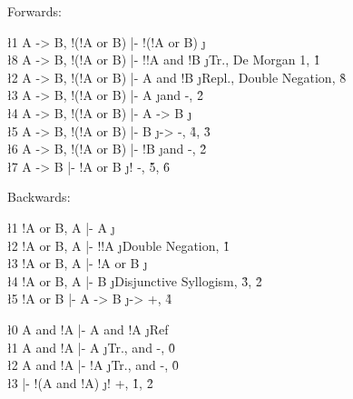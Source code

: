 \documentclass[class=cs245,leqno]{agony}
\begin{document}
\begin{theorem}[Implication]
\end{theorem}
\begin{prf}
  Forwards:
  \begin{deduce}
    \l1 A -> B, !(!A or B) |- !(!A or B) \j {\E}                          \\
    \l8 A -> B, !(!A or B) |- !!A and !B \j {Tr., De Morgan 1, \r1}       \\
    \l2 A -> B, !(!A or B) |- A and !B   \j {Repl., Double Negation, \r8} \\
    \l3 A -> B, !(!A or B) |- A          \j {and -, \r2}                  \\
    \l4 A -> B, !(!A or B) |- A -> B     \j {\E}                          \\
    \l5 A -> B, !(!A or B) |- B          \j {-> -, \r4, \r3}              \\
    \l6 A -> B, !(!A or B) |- !B         \j {and -, \r2}                  \\
    \l7 A -> B             |- !A or B    \j {! -, \r5, \r6}
  \end{deduce}
  Backwards:
  \begin{deduce}
    \l1 !A or B, A |- A       \j {\E}                              \\
    \l2 !A or B, A |- !!A     \j {Double Negation, \r1}            \\
    \l3 !A or B, A |- !A or B \j {\E}                              \\
    \l4 !A or B, A |- B       \j {Disjunctive Syllogism, \r3, \r2} \\
    \l5 !A or B    |- A -> B  \j {-> +, \r4}
  \end{deduce}
\end{prf}

\begin{theorem}
\end{theorem}
\begin{prf}
  \begin{deduce}
    \l0 A and !A |- A and !A    \j {Ref}             \\
    \l1 A and !A |- A           \j {Tr., and -, \r0} \\
    \l2 A and !A |- !A          \j {Tr., and -, \r0} \\
    \l3 \0       |- !(A and !A) \j {! +, \r1, \r2}
  \end{deduce}
\end{prf}
\end{document}

